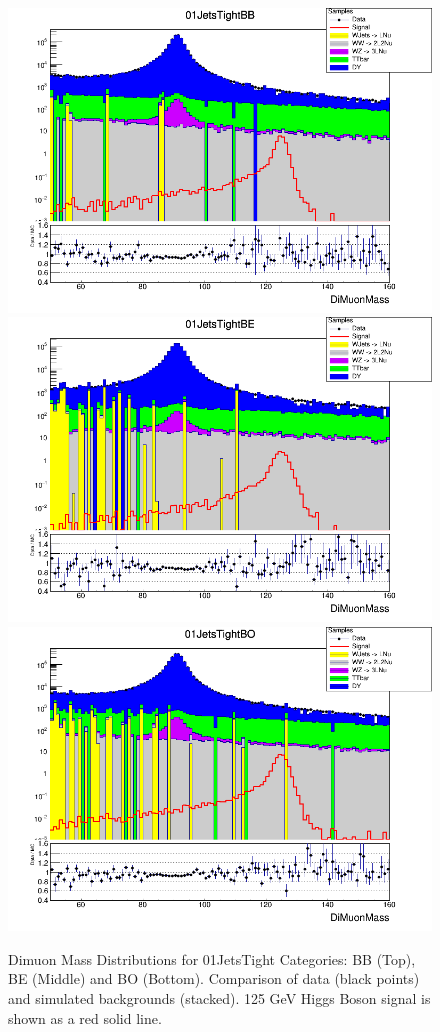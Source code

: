 \begin{figure}[htbp]
  \centering
  \includegraphics[width=0.65\linewidth]{figures/ch_higgs/distributions/baseline_kalman/distribution__01JetsTightBB__DiMuonMass__logY.png}\\
  \includegraphics[width=0.65\linewidth]{figures/ch_higgs/distributions/baseline_kalman/distribution__01JetsTightBE__DiMuonMass__logY.png}\\
  \includegraphics[width=0.65\linewidth]{figures/ch_higgs/distributions/baseline_kalman/distribution__01JetsTightBO__DiMuonMass__logY.png}
  \caption{Dimuon Mass Distributions for 01JetsTight Categories: BB (Top), BE (Middle) and BO (Bottom). Comparison of data (black points) and simulated backgrounds (stacked). 125 GeV Higgs Boson signal is shown as a red solid line.}
  \label{fig:higgs_categorization_01jetstightbbbebo}
\end{figure}
